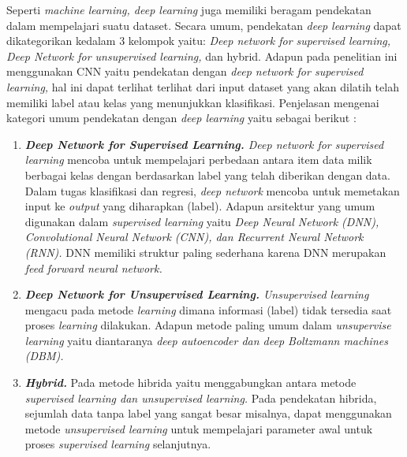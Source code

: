 Seperti \textit{machine learning, deep learning} juga memiliki beragam pendekatan dalam mempelajari suatu dataset. Secara umum, pendekatan \textit{deep learning} dapat dikategorikan kedalam 3 kelompok yaitu: \textit{Deep network for supervised learning, Deep Network for unsupervised learning,} dan hybrid. Adapun pada penelitian ini menggunakan CNN yaitu pendekatan dengan \textit{deep network for supervised learning,} hal ini dapat terlihat terlihat dari input dataset yang akan dilatih telah memiliki label atau kelas yang menunjukkan klasifikasi. Penjelasan mengenai kategori umum pendekatan dengan \textit{deep learning} yaitu sebagai berikut \citep*{ahmad2019deep}: \par

\begin{enumerate}[nolistsep]
    \item \textit{\textbf{Deep Network for Supervised Learning.} Deep network for supervised learning} mencoba untuk mempelajari perbedaan antara item data milik berbagai kelas dengan berdasarkan label yang telah diberikan dengan data. Dalam tugas klasifikasi dan regresi, \textit{deep network} mencoba untuk memetakan input ke \textit{output} yang diharapkan (label). Adapun arsitektur yang umum digunakan dalam \textit{supervised learning} yaitu \textit{Deep Neural Network (DNN), Convolutional Neural Network (CNN), \textnormal{dan} Recurrent Neural Network (RNN).} DNN memiliki struktur paling sederhana karena DNN merupakan \textit{feed forward neural network.}
    \item \textit{\textbf{Deep Network for Unsupervised Learning.} Unsupervised learning} mengacu pada metode \textit{learning} dimana informasi (label) tidak tersedia saat proses \textit{learning} dilakukan. Adapun metode paling umum dalam \textit{unsupervise learning} yaitu diantaranya \textit{deep autoencoder \textnormal{dan} deep Boltzmann machines (DBM).}
    \item \textit{\textbf{Hybrid.}} Pada metode hibrida yaitu menggabungkan antara metode \textit{supervised learning \textnormal{dan} unsupervised learning.} Pada pendekatan hibrida, sejumlah data tanpa label yang sangat besar misalnya, dapat menggunakan metode \textit{unsupervised learning} untuk mempelajari parameter awal untuk proses \textit{supervised learning} selanjutnya.  
\end{enumerate}

